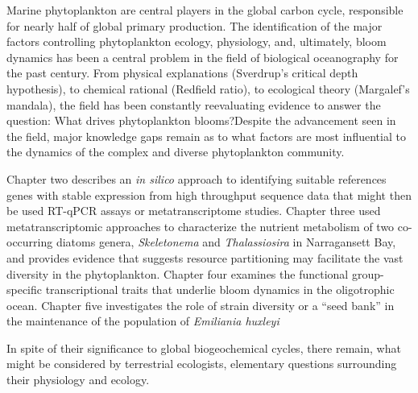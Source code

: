 % 
% 
%
Marine phytoplankton are central players in the global carbon cycle, responsible for nearly half of global primary production. The identification of the major factors controlling phytoplankton ecology, physiology, and, ultimately, bloom dynamics has been a central problem in the field of biological oceanography for the past century. From physical explanations (Sverdrup's critical depth hypothesis), to chemical rational (Redfield ratio), to ecological theory (Margalef's mandala), the field has been constantly reevaluating evidence to answer the question: What drives phytoplankton blooms?Despite the advancement seen in the field, major knowledge gaps remain as to what factors are most influential to the dynamics of the
complex and diverse phytoplankton community. 


Chapter two describes an \textit{in silico} approach to identifying suitable references genes with stable expression from high throughput sequence data that might then be used RT-qPCR assays or metatranscriptome studies. Chapter three used metatranscriptomic approaches to characterize the nutrient metabolism of two co-occurring diatoms genera, \textit{Skeletonema} and \textit{Thalassiosira} in Narragansett Bay, and provides evidence that suggests resource partitioning may facilitate the vast diversity in the phytoplankton. Chapter four examines the functional group-specific transcriptional traits that underlie bloom dynamics in the oligotrophic ocean. Chapter five investigates the role of strain diversity or a ``seed bank'' in the maintenance of the population of \textit{Emiliania huxleyi}


In spite of their significance to global biogeochemical cycles, there remain, what might be considered by terrestrial ecologists, elementary questions surrounding their physiology and ecology. 
